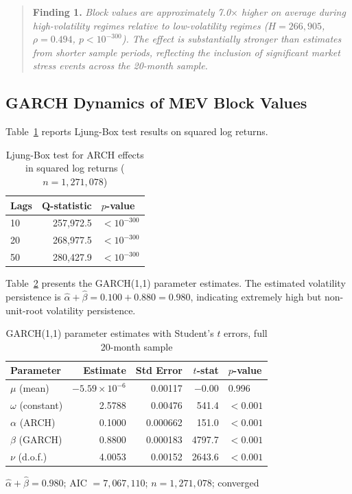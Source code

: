 \documentclass[11pt]{article}
\begin{document}
\begin{quote}
\textbf{Finding 1.} \textit{Block values are approximately 7.0$\times$ higher
on average during high-volatility regimes relative to low-volatility regimes
($H = 266{,}905$, $\rho = 0.494$, $p < 10^{-300}$). The effect is
substantially stronger than estimates from shorter sample periods, reflecting
the inclusion of significant market stress events across the 20-month sample.}
\end{quote}

\subsection{GARCH Dynamics of MEV Block Values}
\label{sec:garch}

Table~\ref{tab:ljungbox} reports Ljung-Box test results on squared log returns.

\begin{table}[h]
\centering
\caption{Ljung-Box test for ARCH effects in squared log returns ($n = 1{,}271{,}078$)}
\label{tab:ljungbox}
\begin{tabular}{lrl}
\toprule
Lags & Q-statistic & $p$-value \\
\midrule
10 & 257,972.5 & $< 10^{-300}$ \\
20 & 268,977.5 & $< 10^{-300}$ \\
50 & 280,427.9 & $< 10^{-300}$ \\
\bottomrule
\end{tabular}
\end{table}

Table~\ref{tab:garch} presents the GARCH(1,1) parameter estimates. The
estimated volatility persistence is $\hat\alpha + \hat\beta = 0.100 + 0.880 =
0.980$, indicating extremely high but non-unit-root volatility persistence.

\begin{table}[!htbp]
\centering
\caption{GARCH(1,1) parameter estimates with Student's $t$ errors, full 20-month sample}
\label{tab:garch}
\begin{tabular}{lrrrl}
\toprule
Parameter & Estimate & Std Error & $t$-stat & $p$-value \\
\midrule
$\mu$ (mean) & $-5.59 \times 10^{-6}$ & 0.00117 & $-0.00$ & 0.996 \\
$\omega$ (constant) & 2.5788 & 0.00476 & 541.4 & $< 0.001$ \\
$\alpha$ (ARCH) & 0.1000 & 0.000662 & 151.0 & $< 0.001$ \\
$\beta$ (GARCH) & 0.8800 & 0.000183 & 4797.7 & $< 0.001$ \\
$\nu$ (d.o.f.) & 4.0053 & 0.00152 & 2643.6 & $< 0.001$ \\
\bottomrule
\end{tabular}

\smallskip
\footnotesize $\hat\alpha + \hat\beta = 0.980$; AIC $= 7{,}067{,}110$; $n = 1{,}271{,}078$; converged
\end{table}
\end{document}
